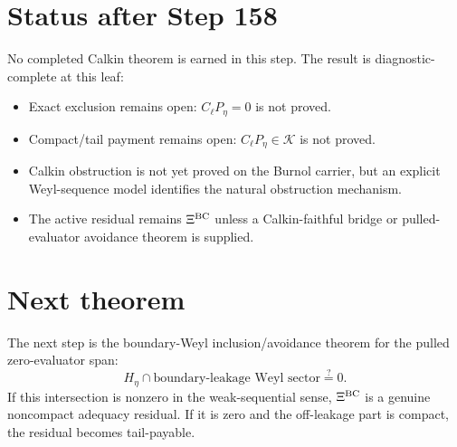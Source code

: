 \documentclass[11pt]{article}
\begin{document}
\section{Status after Step 158}
No completed Calkin theorem is earned in this step.  The result is diagnostic-complete at this leaf:
\begin{itemize}[leftmargin=2em]
\item Exact exclusion remains open: $C_\ell P_\eta=0$ is not proved.
\item Compact/tail payment remains open: $C_\ell P_\eta\in\mathcal K$ is not proved.
\item Calkin obstruction is not yet proved on the Burnol carrier, but an explicit Weyl-sequence model identifies the natural obstruction mechanism.
\item The active residual remains $\Xi^{\rm BC}$ unless a Calkin-faithful bridge or pulled-evaluator avoidance theorem is supplied.
\end{itemize}

\section{Next theorem}
The next step is the boundary-Weyl inclusion/avoidance theorem for the pulled zero-evaluator span:
\[
  H_\eta\cap\text{boundary-leakage Weyl sector}
  \stackrel{?}{=}0.
\]
If this intersection is nonzero in the weak-sequential sense, $\Xi^{\rm BC}$ is a genuine noncompact
adequacy residual.  If it is zero and the off-leakage part is compact, the residual becomes tail-payable.
\end{document}
